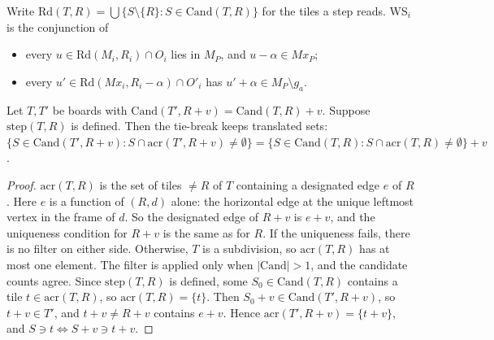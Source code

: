 \begin{definition}\label{def:ws}
Write $\mathrm{Rd}(T,R)=\bigcup\{S\setminus\{R\}:S\in\mathrm{Cand}(T,R)\}$ for the tiles a step reads. WS$_i$ is the conjunction of
\begin{itemize}
\item[(M)] every $u\in\mathrm{Rd}(M_i,R_i)\cap O_i$ lies in $M_P$, and $u-\alpha\in Mx_P$;
\item[(X)] every $u'\in\mathrm{Rd}(Mx_i,R_i-\alpha)\cap O'_i$ has $u'+\alpha\in M_P\setminus g_a$.
\end{itemize}
\end{definition}

\begin{lemma}\label{lem:acr}
Let $T,T'$ be boards with $\mathrm{Cand}(T',R+v)=\mathrm{Cand}(T,R)+v$. Suppose $\mathrm{step}(T,R)$ is defined. Then the tie-break keeps translated sets: $\{S\in\mathrm{Cand}(T',R+v):S\cap\mathrm{acr}(T',R+v)\ne\emptyset\}=\{S\in\mathrm{Cand}(T,R):S\cap\mathrm{acr}(T,R)\ne\emptyset\}+v$.
\end{lemma}
\begin{proof}
$\mathrm{acr}(T,R)$ is the set of tiles $\ne R$ of $T$ containing a designated edge $e$ of $R$. Here $e$ is a function of $(R,d)$ alone: the horizontal edge at the unique leftmost vertex in the frame of $d$. So the designated edge of $R+v$ is $e+v$, and the uniqueness condition for $R+v$ is the same as for $R$.
If the uniqueness fails, there is no filter on either side. Otherwise, $T$ is a subdivision, so $\mathrm{acr}(T,R)$ has at most one element.
The filter is applied only when $|\mathrm{Cand}|>1$, and the candidate counts agree. Since $\mathrm{step}(T,R)$ is defined, some $S_0\in\mathrm{Cand}(T,R)$ contains a tile $t\in\mathrm{acr}(T,R)$, so $\mathrm{acr}(T,R)=\{t\}$.
Then $S_0+v\in\mathrm{Cand}(T',R+v)$, so $t+v\in T'$, and $t+v\ne R+v$ contains $e+v$. Hence $\mathrm{acr}(T',R+v)=\{t+v\}$, and $S\ni t\iff S+v\ni t+v$.
\end{proof}

